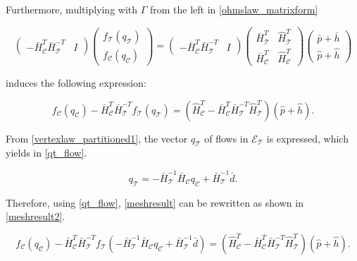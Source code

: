 Furthermore, multiplying with $\Gamma$ from the left in \eqref{ohmslaw_matrixform} 

\begin{equation}
\label{ohmslaw_matrixform_B}
\begin{pmatrix} 
-\bar{H}^T_{\mathcal{C}}\bar{H}^{-T}_{\mathcal{T}} & I 
\end{pmatrix}
 \begin{pmatrix} 
 f_{\mathcal{T}}(q_\mathcal{T}) \\[3pt] 
 f_{\mathcal{C}}(q_\mathcal{C}) 
 \end{pmatrix}
 =
 \begin{pmatrix} 
-\bar{H}^T_{\mathcal{C}}\bar{H}^{-T}_{\mathcal{T}} & I 
\end{pmatrix}
  \begin{pmatrix}
   \bar{H}^T_{\mathcal{T}} & \hat{H}^T_{\mathcal{T}} \\[3pt]
   \bar{H}^T_{\mathcal{C}} & \hat{H}^T_{\mathcal{C}} 
   \end{pmatrix}
   \begin{pmatrix} 
 \bar{p} + \bar{h} \\[3pt]
 \hat{p} + \hat{h} 
 \end{pmatrix}
\end{equation}

induces the following expression:

\begin{equation}
\label{meshresult}
f_{\mathcal{C}}(q_\mathcal{C}) -\bar{H}^T_{\mathcal{C}}\bar{H}^{-T}_{\mathcal{T}} f_{\mathcal{T}}(q_\mathcal{T}) = (\hat{H}^T_{\mathcal{C}} -\bar{H}^T_{\mathcal{C}}\bar{H}^{-T}_{\mathcal{T}}\hat{H}^T_{\mathcal{T}})(\hat{p} + \hat{h}).
\end{equation}

From \eqref{vertexlaw_partitioned1}, the vector $q_{\mathcal{T}}$ of flows in $\mathcal{E}_{\mathcal{T}}$ is expressed, which yields in \eqref{qt_flow}.

\begin{equation}
\label{qt_flow}
q_{\mathcal{T}} = -\bar{H}^{-1}_{\mathcal{T}} \bar{H}_{\mathcal{C}} q_\mathcal{C} + \bar{H}^{-1}_{\mathcal{T}} \bar{d}.
\end{equation}

Therefore, using \eqref{qt_flow}, \eqref{meshresult} can be rewritten as shown in \eqref{meshresult2}.

\begin{equation}
\label{meshresult2}
f_{\mathcal{C}}(q_\mathcal{C}) -\bar{H}^T_{\mathcal{C}}\bar{H}^{-T}_{\mathcal{T}} f_{\mathcal{T}}(-\bar{H}^{-1}_{\mathcal{T}} \bar{H}_{\mathcal{C}} q_\mathcal{C} + \bar{H}^{-1}_{\mathcal{T}} \bar{d}) = (\hat{H}^T_{\mathcal{C}} -\bar{H}^T_{\mathcal{C}}\bar{H}^{-T}_{\mathcal{T}}\hat{H}^T_{\mathcal{T}})(\hat{p} + \hat{h}).
\end{equation} 

